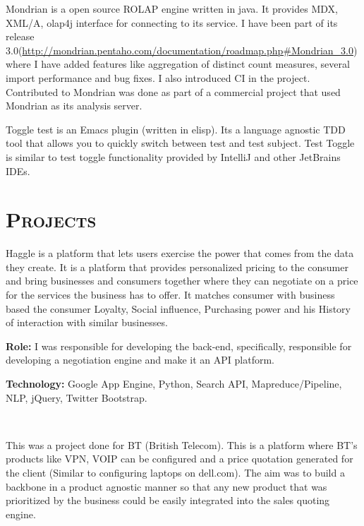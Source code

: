 \begin{resume}
\begin{position}
Mondrian is a open source ROLAP engine written in java. It provides MDX, XML/A, olap4j interface for connecting to its service. I have been part of its release 3.0(\url{http://mondrian.pentaho.com/documentation/roadmap.php#Mondrian_3.0}) where I have added features like aggregation of distinct count measures, several import performance and bug fixes. I also introduced CI in the project. Contributed to Mondrian  was done as part of a commercial project that used Mondrian as its analysis server.
\end{position}

\begin{position}
Toggle test is an Emacs plugin (written in elisp). Its a language agnostic TDD tool that allows you to quickly switch between test and test subject. Test Toggle is similar to test toggle functionality provided by IntelliJ and other JetBrains IDEs.
\end{position}

\section{\textsc{Projects}}

\begin{position}
Haggle is a platform that lets users exercise the power that comes from the data they create. It is a platform that provides personalized pricing to the consumer and bring businesses and consumers together where they can negotiate on a price for the services the business has to offer. It matches consumer with business based the consumer Loyalty, Social influence, Purchasing power and his History of interaction with similar businesses.

{\textbf{Role:}} I was responsible for developing the back-end, specifically, responsible for developing a negotiation engine and make it an API platform.

{\textbf{Technology:}} Google App Engine, Python, Search API, Mapreduce/Pipeline, NLP, jQuery, Twitter Bootstrap. 
\end{position}\\

\begin{position}
This was a project done for  BT (British Telecom). This is a platform where BT's products like VPN, VOIP can be configured and a price quotation generated for the client (Similar to configuring laptops on dell.com). The aim was to build a backbone in
a product agnostic manner so that any new product that was prioritized by the business could be easily integrated into the sales quoting engine.


\end{position}
\end{resume}
